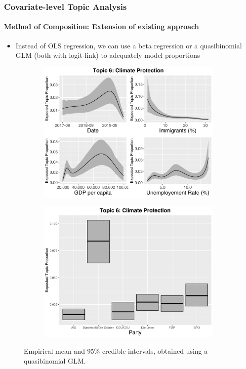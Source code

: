 \documentclass[xcolor=dvipsnames]{beamer}
\begin{document}
\begin{frame}
\frametitle{Covariate-level Topic Analysis}
\framesubtitle{Method of Composition: Extension of existing approach}
\begin{itemize}
\item Instead of OLS regression, we can use a beta regression or a quasibinomial GLM (both with logit-link) to adequately model proportions
\end{itemize}
\begin{figure}[h!]
  \centering
  \captionsetup{justification=centering,margin=2cm}
  \begin{subfigure}[b]{0.4\linewidth}
    \includegraphics[width=\linewidth]{../../plots/presentation/quasi_t6_cont.pdf}
  \end{subfigure}
  \begin{subfigure}[b]{0.4\linewidth}
    \includegraphics[width=\linewidth]{../../plots/presentation/quasi_t6_cat.pdf}
  \end{subfigure}
  \caption{Empirical mean and 95\% credible intervals, obtained using a quasibinomial GLM.}
  \label{fig:quasi_t46_cont}
\end{figure}
\end{frame}
\end{document}
